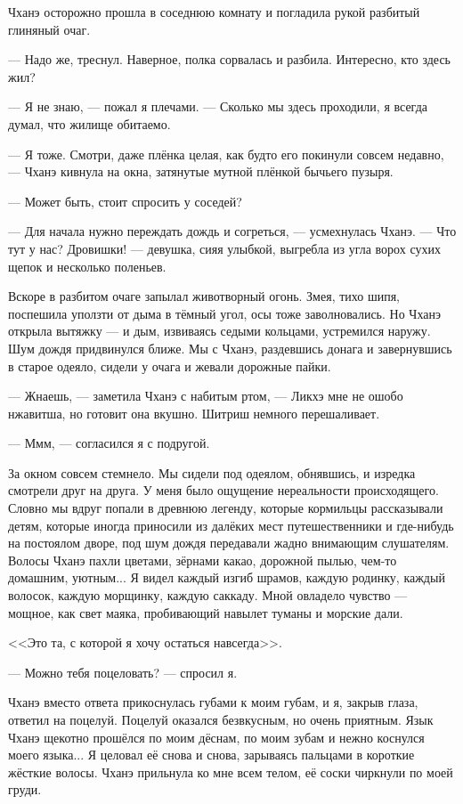 Чханэ осторожно прошла в соседнюю комнату и погладила рукой разбитый глиняный очаг.

--- Надо же, треснул.
Наверное, полка сорвалась и разбила.
Интересно, кто здесь жил?

--- Я не знаю, --- пожал я плечами.
--- Сколько мы здесь проходили, я всегда думал, что жилище обитаемо.

--- Я тоже.
Смотри, даже плёнка целая, как будто его покинули совсем недавно, --- Чханэ кивнула на окна, затянутые мутной плёнкой бычьего пузыря.

--- Может быть, стоит спросить у соседей?

--- Для начала нужно переждать дождь и согреться, --- усмехнулась Чханэ.
--- Что тут у нас?
Дровишки! --- девушка, сияя улыбкой, выгребла из угла ворох сухих щепок и несколько поленьев.

Вскоре в разбитом очаге запылал животворный огонь.
Змея, тихо шипя, поспешила уползти от дыма в тёмный угол, осы тоже заволновались.
Но Чханэ открыла вытяжку --- и дым, извиваясь седыми кольцами, устремился наружу.
Шум дождя придвинулся ближе.
Мы с Чханэ, раздевшись донага и завернувшись в старое одеяло, сидели у очага и жевали дорожные пайки.

--- Жнаешь, --- заметила Чханэ с набитым ртом, --- Ликхэ мне не ошобо нжавитша, но готовит она вкушно.
Шитриш немного перешаливает.

--- Ммм, --- согласился я с подругой.

За окном совсем стемнело.
Мы сидели под одеялом, обнявшись, и изредка смотрели друг на друга.
У меня было ощущение нереальности происходящего.
Словно мы вдруг попали в древнюю легенду, которые кормильцы рассказывали детям, которые иногда приносили из далёких мест путешественники и где-нибудь на постоялом дворе, под шум дождя передавали жадно внимающим слушателям.
Волосы Чханэ пахли цветами, зёрнами какао, дорожной пылью, чем-то домашним, уютным...
Я видел каждый изгиб шрамов, каждую родинку, каждый волосок, каждую морщинку, каждую саккаду.
Мной овладело чувство --- мощное, как свет маяка, пробивающий навылет туманы и морские дали.

<<Это та, с которой я хочу остаться навсегда>>.

--- Можно тебя поцеловать? --- спросил я.

Чханэ вместо ответа прикоснулась губами к моим губам, и я, закрыв глаза, ответил на поцелуй.
Поцелуй оказался безвкусным, но очень приятным.
Язык Чханэ щекотно прошёлся по моим дёснам, по моим зубам и нежно коснулся моего языка...
Я целовал её снова и снова, зарываясь пальцами в короткие жёсткие волосы.
Чханэ прильнула ко мне всем телом, её соски чиркнули по моей груди.


